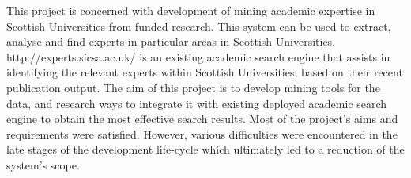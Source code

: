 This project is concerned with development of mining academic expertise in Scottish Universities from funded research.
This system can be used to extract, analyse and find experts in particular areas in Scottish Universities. 
http://experts.sicsa.ac.uk/ is an existing academic search engine 
that assists in identifying the relevant experts within Scottish Universities, based on their recent publication output. 
The aim of this project is to develop mining tools for the data, and research ways to integrate it with existing deployed academic search engine
to obtain the most effective search results. Most of the project’s aims and requirements were satisfied. However, various difficulties were
encountered in the late stages of the development life-cycle which ultimately led to a reduction of
the system’s scope.
